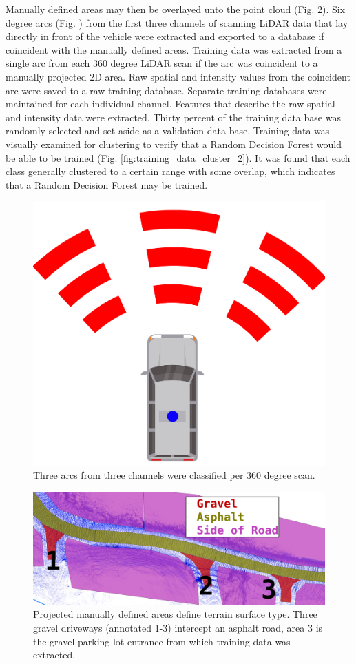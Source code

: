 \documentclass[journal,onecolumn]{IEEEtran}
\begin{document}
			{Manually defined areas may then be overlayed unto the point cloud (Fig. \ref{fig:road_areas_annotated_22}). Six degree arcs (Fig. \cite{fig:area_example}) from the first three channels of scanning LiDAR data that lay directly in front of the vehicle were extracted and exported to a database if coincident with the manually defined areas. Training data was extracted from a single arc from each 360 degree LiDAR scan if the arc was coincident to a manually projected 2D area. Raw spatial and intensity values from the coincident arc were saved to a raw training database. Separate training databases were maintained for each individual channel. Features that describe the raw spatial and intensity data were extracted. Thirty percent of the training data base was randomly selected and set aside as a validation data base. Training data was visually examined for clustering to verify that a Random Decision Forest would be able to be trained (Fig. \ref{fig:training_data_cluster_2}). It was found that each class generally clustered to a certain range with some overlap, which indicates that a Random Decision Forest may be trained.}
			
			\begin{figure}[H]
				\centering
				\includegraphics[width=0.25\linewidth]{figures/area_example}
				\caption[Areas to Classify]{Three arcs from three channels were classified per 360 degree scan. }
				\label{fig:area_example}
			\end{figure}
			

			\begin{figure}[H]
				\centering
				\includegraphics[width=0.75\linewidth]{figures/road_areas_annotated_22}
				\caption[Manually Classified Point Cloud Data]{ Projected manually defined areas define terrain surface type. Three gravel driveways (annotated 1-3) intercept an asphalt road, area $3$ is the gravel parking lot entrance from which training data was extracted.}
				\label{fig:road_areas_annotated_22}
			\end{figure}	
			
\end{document}
